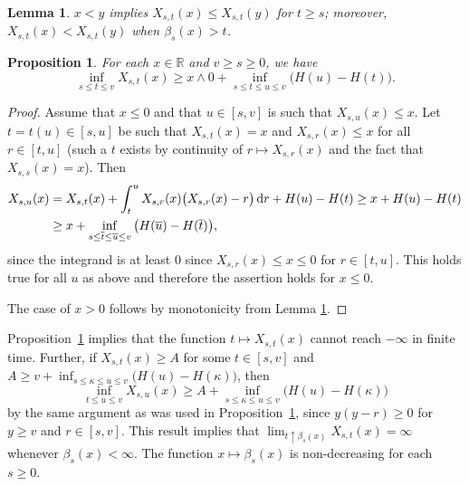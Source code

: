 \documentclass[sn-mathphys-num]{sn-jnl}
\newtheorem{lem}[thm]{Lemma}
\newtheorem{prp}[thm]{Proposition}
\theoremstyle{definition}
\newcommand{\scr}[1]{\mathscr #1}
\numberwithin{equation}{section} \theoremstyle{remark}
\renewcommand{\d}{\hbox{d}}
\def\R{\mathbb R}
\def\d{\text{\rm{d}}} \def\bb{\beta} \def\aa{\alpha} \def\D{\scr D}
\newcommand{\1}{\mathbbm{1}}
\renewcommand{\bar}{\overline}
\begin{document}
\begin{lem}\label{monot}
  $x < y$ implies $X_{s,t}(x) \leq X_{s,t}(y)$ for $t \geq s$;
  moreover,   $X_{s,t}(x) < X_{s,t}(y)$ when $\beta_s(x)>t$.
\end{lem}






\begin{prp} \label{Xinf}
  For each $x\in \R$ and $v \geq s\geq 0$, we
  have
  $$
\inf_{s\leq t \leq v} X_{s,t}(x)\geq x\wedge 0+\inf_{s \leq t \leq u \leq v} \big(H(u)-H(t)\big).
$$
\end{prp}


\begin{proof}
  Assume that $x \leq 0$ and that $u \in [s,v]$ is such that $X_{s,u}(x)\leq x$. Let $t=t(u)\in [s,u]$ be such that $X_{s,t}(x)=x$ and $X_{s,r}(x)\leq x$ for all $r \in [t,u]$ 
(such a $t$ exists by continuity of $r \mapsto X_{s,r}(x)$ and the fact that $X_{s,s}(x)=x$). Then
\begin{align*}
X_{s,u}(x)&=X_{s,t}(x)+\int_t^u X_{s,r}(x)\big(X_{s,r}(x) -r\big)\,\d r+H(u)-H(t) \geq x +H(u)-H(t)\\&\geq x+ \inf_{s \leq \bar t \leq \bar u \leq v} \big(H(\bar u)-H(\bar t)\big),
\end{align*}
since the integrand is at least 0 since  $X_{s,r}(x)\leq x \leq 0$ for $r \in [t,u]$. This holds true for all $u$ as above and therefore the assertion holds for $x \leq 0$.

The case of $x>0$ follows by monotonicity from Lemma \ref{monot}.
\end{proof}  





Proposition~\ref{Xinf} implies that the function
$t \mapsto X_{s,t}(x)$ cannot reach $-\infty$ in finite time. Further,
if $X_{s,t}(x)\geq A$ for some $t \in [s,v]$ and
$A \geq v+ \inf_{s \leq \kappa \leq u \leq v}\big(
H(u)-H(\kappa)\big)$, then
$$
\inf_{t\leq u \leq v}X_{s,u}(x)\geq A + \inf_{s \leq \kappa \leq u \leq v}\big( H(u)-H(\kappa)\big)
$$
by the same argument as was used in Proposition~\ref{Xinf}, since
$y(y-r)\geq 0$ for $y \geq v$ and $r \in [s,v]$. This result implies that
$\lim_{t \uparrow \beta_s(x)}X_{s,t}(x)=\infty$ whenever
$\beta_s(x)<\infty$. The function $x \mapsto \beta_s(x)$ is
non-decreasing for each $s \geq 0$.
\end{document}
